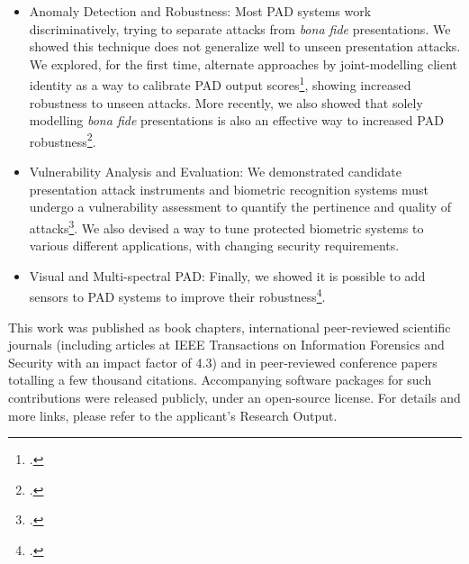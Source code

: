 \documentclass[a4paper,10pt,onecolumn]{article}
\begin{document}
\begin{itemize}

  \item Anomaly Detection and Robustness: Most PAD systems work
      discriminatively, trying to separate attacks from \textit{bona fide}
      presentations.  We showed this technique does not generalize well to
      unseen presentation attacks.  We explored, for the first time, alternate
      approaches by joint-modelling client identity as a way to calibrate PAD
      output scores\footcite{tifs-2015}, showing increased robustness to unseen
      attacks.  More recently, we also showed that solely modelling
      \textit{bona fide} presentations is also an effective way to increased
      PAD robustness\footcite{icb-2018}.

  \item Vulnerability Analysis and Evaluation: We demonstrated candidate
      presentation attack instruments and biometric recognition systems must
      undergo a vulnerability assessment to quantify the pertinence and quality
      of attacks\footcite{tifs-2014}.  We also devised a way to tune protected
      biometric systems to various different applications, with changing
      security requirements.

  \item Visual and Multi-spectral PAD: Finally, we showed it is possible to add
      sensors to PAD systems to improve their robustness\footcite{tifs-2019-2}.

\end{itemize}

This work was published as book chapters, international peer-reviewed
scientific journals (including articles at IEEE Transactions on Information
Forensics and Security with an impact factor of 4.3) and in peer-reviewed
conference papers totalling a few thousand citations.  Accompanying software
packages for such contributions were released publicly, under an open-source
license. For details and more links, please refer to the applicant's Research
Output.
\end{document}

